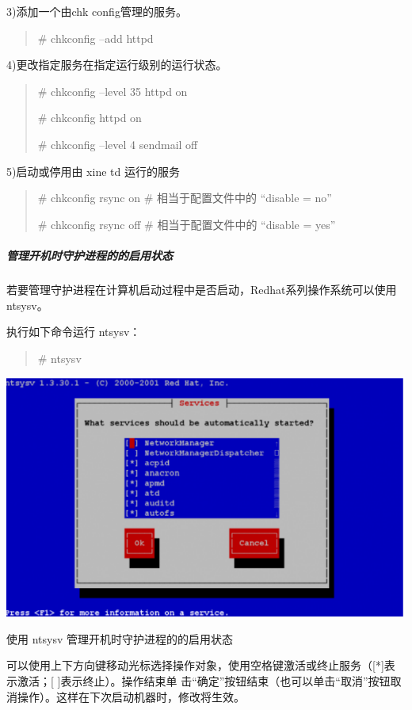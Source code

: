 \documentclass[letterpaper,10pt]{sphinxmanual}
\begin{document}
3)添加一个由chk config管理的服务。
\begin{quote}

\# chkconfig --add httpd
\end{quote}

4)更改指定服务在指定运行级别的运行状态。
\begin{quote}

\# chkconfig --level 35 httpd on

\# chkconfig httpd on

\# chkconfig --level 4 sendmail off
\end{quote}

5)启动或停用由 xine td 运行的服务
\begin{quote}

\# chkconfig rsync on \# 相当于配置文件中的 ``disable = no''

\# chkconfig rsync off \# 相当于配置文件中的 ``disable = yes''
\end{quote}


\subparagraph{管理开机时守护进程的的启用状态}
\label{Linux_pro_mana/process:id16}
若要管理守护进程在计算机启动过程中是否启动，Redhat系列操作系统可以使用 ntsysv。

执行如下命令运行 ntsysv：
\begin{quote}

\# ntsysv
\end{quote}

\includegraphics{ntsysv.png}

使用 ntsysv 管理开机时守护进程的的启用状态

可以使用上下方向键移动光标选择操作对象，使用空格键激活或终止服务（{[}*{]}表示激活；{[} {]}表示终止）。操作结束单
击“确定”按钮结束（也可以单击“取消”按钮取消操作）。这样在下次启动机器时，修改将生效。
\end{document}
